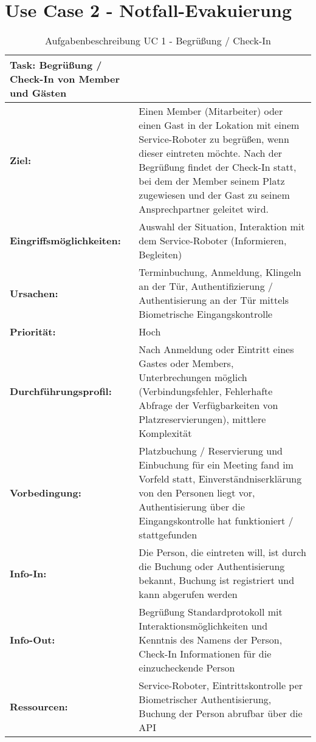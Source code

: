 \section*{Use Case 2 - Notfall-Evakuierung}
\begin{table}[hbt!]
    \begin{center}
        \begin{tabular}{| p{3cm} | p{12.75cm} | }
            \hline
                \textbf{Task: Begrüßung / Check-In von Member und Gästen} \\
            \hline
                \textbf{Ziel:} & Einen Member (Mitarbeiter) oder einen Gast in der Lokation mit einem Service-Roboter zu begrüßen, wenn dieser eintreten möchte. Nach der Begrüßung findet der Check-In statt, bei dem der Member seinem Platz zugewiesen und der Gast zu seinem Ansprechpartner geleitet wird. \\
            \hline
                \textbf{Eingriffsmöglichkeiten:} & Auswahl der Situation, Interaktion mit dem Service-Roboter (Informieren, Begleiten)  \\
            \hline
                \textbf{Ursachen:} & Terminbuchung, Anmeldung, Klingeln an der Tür, Authentifizierung / Authentisierung an der Tür mittels Biometrische Eingangskontrolle \\
            \hline
                \textbf{Priorität:} & Hoch \\
            \hline
                \textbf{Durchführungsprofil:} & Nach Anmeldung oder Eintritt eines Gastes oder Members, Unterbrechungen möglich (Verbindungsfehler, Fehlerhafte Abfrage der Verfügbarkeiten von Platzreservierungen), mittlere Komplexität \\ 
            \hline
                \textbf{Vorbedingung:} & Platzbuchung / Reservierung und Einbuchung für ein Meeting fand im Vorfeld statt, Einverständniserklärung von den Personen liegt vor, Authentisierung über die Eingangskontrolle hat funktioniert / stattgefunden \\
            \hline 
                \textbf{Info-In:} & Die Person, die eintreten will, ist durch die Buchung oder Authentisierung bekannt, Buchung ist registriert und kann abgerufen werden \\
            \hline
                \textbf{Info-Out:} & Begrüßung Standardprotokoll mit Interaktionsmöglichkeiten und Kenntnis des Namens der Person, Check-In Informationen für die einzucheckende Person \\
            \hline
                \textbf{Ressourcen:} & Service-Roboter, Eintrittskontrolle per Biometrischer Authentisierung, Buchung der Person abrufbar über die API \\
            \hline
        \end{tabular}
    \end{center}
    \caption{Aufgabenbeschreibung UC 1 - Begrüßung / Check-In}
    \label{tab:checkIn}
\end{table}

